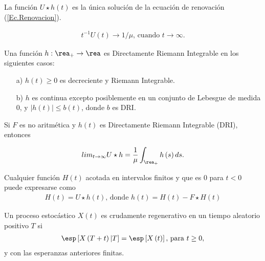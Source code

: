\begin{Prop}
La funci\'on $U\star h\left(t\right)$ es la \'unica soluci\'on de la ecuaci\'on de renovaci\'on (\ref{Ec.Renovacion}).
\end{Prop}

\begin{Teo}
\begin{eqnarray*}
t^{-1}U\left(t\right)\rightarrow 1/\mu\textrm{,    cuando }t\rightarrow\infty.
\end{eqnarray*}
\end{Teo}


\begin{Note} Una funci\'on $h:\rea_{+}\rightarrow\rea$ es Directamente Riemann Integrable en los siguientes casos:
\begin{itemize}
\item[a)] $h\left(t\right)\geq0$ es decreciente y Riemann Integrable.
\item[b)] $h$ es continua excepto posiblemente en un conjunto de Lebesgue de medida 0, y $|h\left(t\right)|\leq b\left(t\right)$, donde $b$ es DRI.
\end{itemize}
\end{Note}

\begin{Teo}
Si $F$ es no aritm\'etica y $h\left(t\right)$ es Directamente Riemann Integrable (DRI), entonces

\begin{eqnarray*}
lim_{t\rightarrow\infty}U\star h=\frac{1}{\mu}\int_{\rea_{+}}h\left(s\right)ds.
\end{eqnarray*}
\end{Teo}

\begin{Prop}
Cualquier funci\'on $H\left(t\right)$ acotada en intervalos finitos y que es 0 para $t<0$ puede expresarse como
\begin{eqnarray*}
H\left(t\right)=U\star h\left(t\right)\textrm{,  donde }h\left(t\right)=H\left(t\right)-F\star H\left(t\right)
\end{eqnarray*}
\end{Prop}

\begin{Def}
Un proceso estoc\'astico $X\left(t\right)$ es crudamente regenerativo en un tiempo aleatorio positivo $T$ si
\begin{eqnarray*}
\esp\left[X\left(T+t\right)|T\right]=\esp\left[X\left(t\right)\right]\textrm{, para }t\geq0,\end{eqnarray*}
y con las esperanzas anteriores finitas.
\end{Def}

